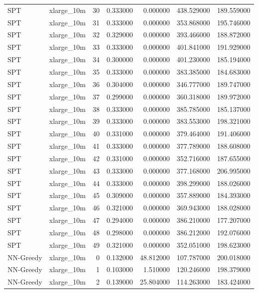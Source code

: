 \begin{tabular}{llrrrrr}
SPT & xlarge_10m & 30 & 0.333000 & 0.000000 & 438.529000 & 189.559000 \\
SPT & xlarge_10m & 31 & 0.333000 & 0.000000 & 353.868000 & 195.746000 \\
SPT & xlarge_10m & 32 & 0.329000 & 0.000000 & 393.466000 & 188.872000 \\
SPT & xlarge_10m & 33 & 0.333000 & 0.000000 & 401.841000 & 191.929000 \\
SPT & xlarge_10m & 34 & 0.300000 & 0.000000 & 401.230000 & 185.194000 \\
SPT & xlarge_10m & 35 & 0.333000 & 0.000000 & 383.385000 & 184.683000 \\
SPT & xlarge_10m & 36 & 0.304000 & 0.000000 & 346.777000 & 189.747000 \\
SPT & xlarge_10m & 37 & 0.299000 & 0.000000 & 360.318000 & 189.972000 \\
SPT & xlarge_10m & 38 & 0.333000 & 0.000000 & 385.785000 & 185.137000 \\
SPT & xlarge_10m & 39 & 0.333000 & 0.000000 & 383.553000 & 198.321000 \\
SPT & xlarge_10m & 40 & 0.331000 & 0.000000 & 379.464000 & 191.406000 \\
SPT & xlarge_10m & 41 & 0.333000 & 0.000000 & 377.789000 & 188.608000 \\
SPT & xlarge_10m & 42 & 0.331000 & 0.000000 & 352.716000 & 187.655000 \\
SPT & xlarge_10m & 43 & 0.333000 & 0.000000 & 377.168000 & 206.995000 \\
SPT & xlarge_10m & 44 & 0.333000 & 0.000000 & 398.299000 & 188.026000 \\
SPT & xlarge_10m & 45 & 0.309000 & 0.000000 & 357.889000 & 184.393000 \\
SPT & xlarge_10m & 46 & 0.321000 & 0.000000 & 369.943000 & 188.028000 \\
SPT & xlarge_10m & 47 & 0.294000 & 0.000000 & 386.210000 & 177.207000 \\
SPT & xlarge_10m & 48 & 0.298000 & 0.000000 & 386.212000 & 192.076000 \\
SPT & xlarge_10m & 49 & 0.321000 & 0.000000 & 352.051000 & 198.623000 \\
NN-Greedy & xlarge_10m & 0 & 0.132000 & 48.812000 & 107.787000 & 200.018000 \\
NN-Greedy & xlarge_10m & 1 & 0.103000 & 1.510000 & 120.246000 & 198.379000 \\
NN-Greedy & xlarge_10m & 2 & 0.139000 & 25.804000 & 114.263000 & 183.424000 \\

\end{tabular}
